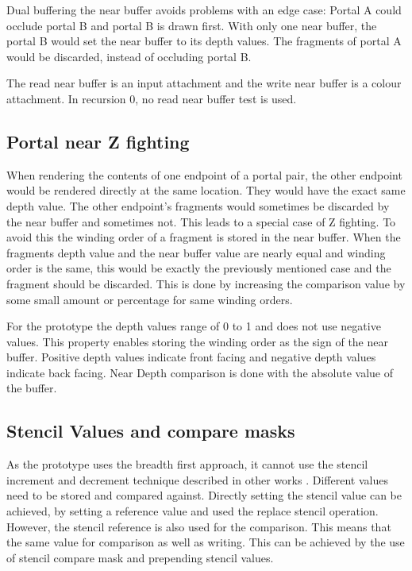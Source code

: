 Dual buffering the near buffer avoids problems with an edge case: Portal A could occlude portal B and portal B is drawn first. With only one near buffer, the portal B would set the near buffer to its depth values. The fragments of portal A would be discarded, instead of occluding portal B.

The read near buffer is an input attachment and the write near buffer is a colour attachment. In recursion 0, no read near buffer test is used.

\subsection{Portal near Z fighting}
\label{section:portalzfighting}
When rendering the contents of one endpoint of a portal pair, the other endpoint would be rendered directly at the same location. They would have the exact same depth value. The other endpoint's fragments would sometimes be discarded by the near buffer and sometimes not. This leads to a special case of Z fighting. To avoid this the winding order of a fragment is stored in the near buffer. When the fragments depth value and the near buffer value are nearly equal and winding order is the same, this would be exactly the previously mentioned case and the fragment should be discarded. This is done by increasing the comparison value by some small amount or percentage for same winding orders.

For the prototype the depth values range of 0 to 1 and does not use negative values. This property enables storing the winding order as the sign of the near buffer. Positive depth values indicate front facing and negative depth values indicate back facing. Near Depth comparison is done with the absolute value of the buffer.

\subsection{Stencil Values and compare masks}
\label{section:stencilcomparemasks}

As the prototype uses the breadth first approach, it cannot use the stencil increment and decrement technique described in other works \cite{schmalstieg:1999:sewing, lowe:2003:fragment, lecture:portalProblems}. Different values need to be stored and compared against. Directly setting the stencil value can be achieved, by setting a reference value and used the replace stencil operation. However, the stencil reference is also used for the comparison. This means that the same value for comparison as well as writing. This can be achieved by the use of stencil compare mask and prepending stencil values.

